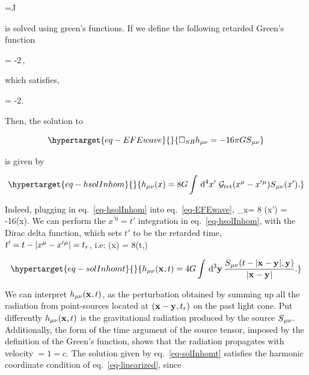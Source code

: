 \documentclass[
  11pt,
  a4paper,
  DIV=11,
  numbers=noendperiod,
  oneside]{scrreprt}
\let\[\relax \let\]\relax %
\DeclareRobustCommand{\[}{\begin{equation}}
\DeclareRobustCommand{\]}{\end{equation}}
\begin{document}
\[\phi=J\]

is solved using green's functions. If we define the following retarded
Green's function

\[
     = -2\pi\,,
\]

which satisfies,

\[
    \SRDA{} = -2\pi {}.
\]

Then, the solution to

\begin{equation}\protect\hypertarget{eq-EFEwave}{}{
 \SRDA \weakmet =  -16 \pi \grav \srcco
}\label{eq-EFEwave}\end{equation}

is given by

\begin{equation}\protect\hypertarget{eq-hsolInhom}{}{
    \weakmet(x) = 8G\int\dd[4]{x'}\,\greens{\ct{x}-\ct{x'}}\srcco(x').
}\label{eq-hsolInhom}\end{equation}


Indeed, plugging in eq.~\ref{eq-hsolInhom} into eq.~\ref{eq-EFEwave}, \[
    \Box_x\weakmet = 8\grav\int{} \srcco(x') = -16\pi \grav\srcco(x).
\] We can perform the \(x^{\prime0}=t'\) integration in
eq.~\ref{eq-hsolInhom}, with the Dirac delta function, which sets \(t'\)
to be the retarded time, \(t'=t-\vert x{}^{\mu}-x'{}^{\mu} \vert= t_r\), i.e: \[
\weakmet(x) = 8\grav\int{}\srcco(t,) 
\]

\begin{equation}\protect\hypertarget{eq-solInhomt}{}{
\weakmet(\tv{x},t) = 4\grav\int\dd[3]{\tv{y}}\frac{\srcco(t-\abs{\tv{x}-\tv{y}},\tv{y})}{\abs{\tv{x}-\tv{y}}}.
}\label{eq-solInhomt}\end{equation}

We can interpret \(h{}_{\mu\nu}(\mathbf{{x}}_{},t)\), as the perturbation obtained by
summing up all the radiation from point-sources located at
\((\mathbf{{x}}_{}-\mathbf{{y}}_{},t_r)\) on the past light cone. Put differently
\(h{}_{\mu\nu}(\mathbf{{x}}_{},t)\) is the gravitational radiation produced by the
source \(S{}_{\mu\nu}\). Additionally, the form of the time argument of the
source tensor, imposed by the definition of the Green's function, shows
that the radiation propagates with velocity \(=1=c\). The solution given
by eq.~\ref{eq-solInhomt} satisfies the harmonic coordinate condition of
eq.~\ref{eq-linearized}, since
\end{document}
